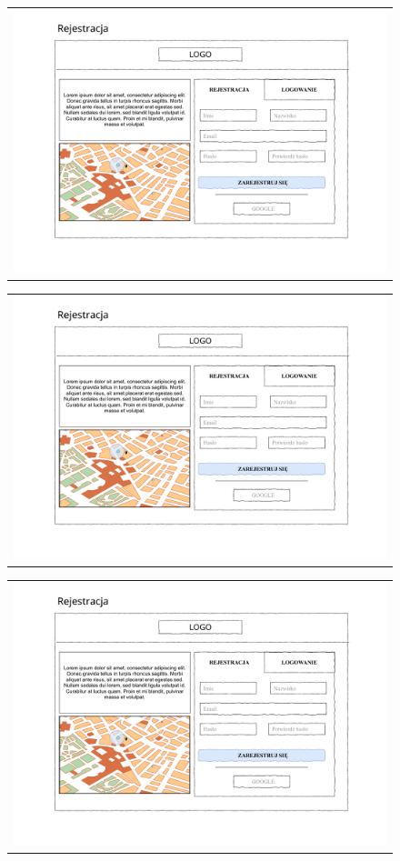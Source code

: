 \documentclass{sprawozdanie-agh}
\begin{document}
		\begin{figure}[H] 
			\centering
			\begin{tabular}{c}
				\includegraphics[page=15, width=.95\textwidth]{Interfejs_Web} 
			\end{tabular} 
		\end{figure}
		\begin{figure}[H] 
			\centering
			\begin{tabular}{c}
				\includegraphics[page=16, width=.95\textwidth]{Interfejs_Web} 
			\end{tabular} 
		\end{figure}
		\begin{figure}[H] 
			\centering
			\begin{tabular}{c}
				\includegraphics[page=17, width=.95\textwidth]{Interfejs_Web} 
			\end{tabular} 
		\end{figure}
\end{document}
